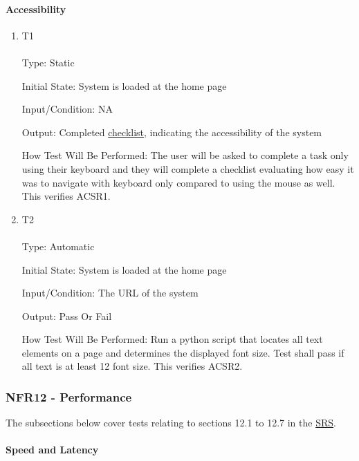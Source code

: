 \documentclass[12pt, titlepage]{article}
\begin{document}
\paragraph{Accessibility}
\begin{enumerate}
\item {T1\\}\\
\hypertarget{NFR11.5-TC1}{}
Type: Static

Initial State: System is loaded at the home page

Input/Condition: NA

Output: Completed \hyperlink{checklist-nfr11}{checklist}, indicating the accessibility of the system

How Test Will Be Performed: The user will be asked to complete a task only using their keyboard and they will complete a checklist evaluating how easy it was to navigate with keyboard only compared to using the mouse as well. This verifies ACSR1.
\item {T2\\}\\
\hypertarget{NFR11.5-TC2}{}
Type: Automatic

Initial State: System is loaded at the home page

Input/Condition: The URL of the system

Output: Pass Or Fail

How Test Will Be Performed: Run a python script that locates all text elements on a page and determines the displayed font size. Test shall pass if all text is at least 12 font size. This verifies ACSR2.
\end{enumerate}

\hypertarget{nfr12}{}
\subsubsection{NFR12 - Performance}

The subsections below cover tests relating to sections 12.1 to 12.7 in the \href{https://shorturl.at/FdAgR}{SRS}.
		
\paragraph{Speed and Latency}
\end{document}
